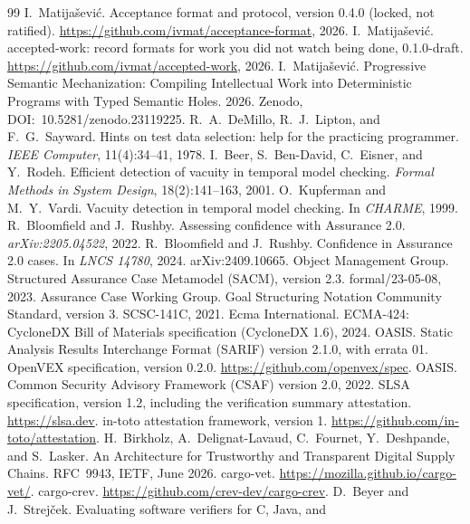 \documentclass[11pt]{article}
\theoremstyle{definition}
\theoremstyle{remark}
\begin{document}
\begin{thebibliography}{99}
\small
{} I.~Matija\v{s}evi\'c. Acceptance format and protocol, version 0.4.0
(locked, not ratified). \url{https://github.com/ivmat/acceptance-format}, 2026.
 I.~Matija\v{s}evi\'c. accepted-work: record formats for work you did not
watch being done, 0.1.0-draft. \url{https://github.com/ivmat/accepted-work}, 2026.
 I.~Matija\v{s}evi\'c. Progressive Semantic Mechanization: Compiling
Intellectual Work into Deterministic Programs with Typed Semantic Holes. 2026. Zenodo,
DOI:~10.5281/zenodo.23119225.
 R.~A.~DeMillo, R.~J.~Lipton, and F.~G.~Sayward. Hints on test data
selection: help for the practicing programmer. \emph{IEEE Computer}, 11(4):34--41, 1978.
 I.~Beer, S.~Ben-David, C.~Eisner, and Y.~Rodeh. Efficient detection of vacuity
in temporal model checking. \emph{Formal Methods in System Design}, 18(2):141--163, 2001.
 O.~Kupferman and M.~Y.~Vardi. Vacuity detection in temporal model checking.
In \emph{CHARME}, 1999.
 R.~Bloomfield and J.~Rushby. Assessing confidence with Assurance 2.0.
\emph{arXiv:2205.04522}, 2022.
 R.~Bloomfield and J.~Rushby. Confidence in Assurance 2.0 cases. In
\emph{LNCS 14780}, 2024. arXiv:2409.10665.
 Object Management Group. Structured Assurance Case Metamodel (SACM), version 2.3.
formal/23-05-08, 2023.
 Assurance Case Working Group. Goal Structuring Notation Community Standard, version
3. SCSC-141C, 2021.
 Ecma International. ECMA-424: CycloneDX Bill of Materials specification
(CycloneDX 1.6), 2024.
 OASIS. Static Analysis Results Interchange Format (SARIF) version 2.1.0, with
errata 01.
 OpenVEX specification, version 0.2.0. \url{https://github.com/openvex/spec}.
 OASIS. Common Security Advisory Framework (CSAF) version 2.0, 2022.
 SLSA specification, version 1.2, including the verification summary attestation.
\url{https://slsa.dev}.
 in-toto attestation framework, version 1. \url{https://github.com/in-toto/attestation}.
 H.~Birkholz, A.~Delignat-Lavaud, C.~Fournet, Y.~Deshpande, and S.~Lasker. An
Architecture for Trustworthy and Transparent Digital Supply Chains. RFC~9943, IETF, June 2026.
 cargo-vet. \url{https://mozilla.github.io/cargo-vet/}.
 cargo-crev. \url{https://github.com/crev-dev/cargo-crev}.
 D.~Beyer and J.~Strej\v{c}ek. Evaluating software verifiers for C, Java, and

\end{thebibliography}
\end{document}
